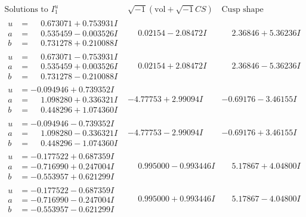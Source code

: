 \documentclass[1p]{elsarticle_modified}
\theoremstyle{definition}
\newcommand{\I}{\sqrt{-1}}
\begin{document}
$$\begin{array}{c|c|c}  
\text{Solutions to }I^u_{1}& \I (\text{vol} + \sqrt{-1}CS) & \text{Cusp shape}\\
 \hline 
\begin{aligned}
u &= \phantom{-}0.673071 + 0.753931 I \\
a &= \phantom{-}0.535459 - 0.003526 I \\
b &= \phantom{-}0.731278 + 0.210088 I\end{aligned}
 & \phantom{-}0.02154 - 2.08472 I & \phantom{-}2.36846 + 5.36236 I \\ \hline\begin{aligned}
u &= \phantom{-}0.673071 - 0.753931 I \\
a &= \phantom{-}0.535459 + 0.003526 I \\
b &= \phantom{-}0.731278 - 0.210088 I\end{aligned}
 & \phantom{-}0.02154 + 2.08472 I & \phantom{-}2.36846 - 5.36236 I \\ \hline\begin{aligned}
u &= -0.094946 + 0.739352 I \\
a &= \phantom{-}1.098280 + 0.336321 I \\
b &= \phantom{-}0.448296 + 1.074360 I\end{aligned}
 & -4.77753 + 2.99094 I & -0.69176 - 3.46155 I \\ \hline\begin{aligned}
u &= -0.094946 - 0.739352 I \\
a &= \phantom{-}1.098280 - 0.336321 I \\
b &= \phantom{-}0.448296 - 1.074360 I\end{aligned}
 & -4.77753 - 2.99094 I & -0.69176 + 3.46155 I \\ \hline\begin{aligned}
u &= -0.177522 + 0.687359 I \\
a &= -0.716990 + 0.247004 I \\
b &= -0.553957 + 0.621299 I\end{aligned}
 & \phantom{-}0.995000 - 0.993446 I & \phantom{-}5.17867 + 4.04800 I \\ \hline\begin{aligned}
u &= -0.177522 - 0.687359 I \\
a &= -0.716990 - 0.247004 I \\
b &= -0.553957 - 0.621299 I\end{aligned}
 & \phantom{-}0.995000 + 0.993446 I & \phantom{-}5.17867 - 4.04800 I \\ \hline\begin{aligned}

\end{aligned}
\end{array}$$
\end{document}
